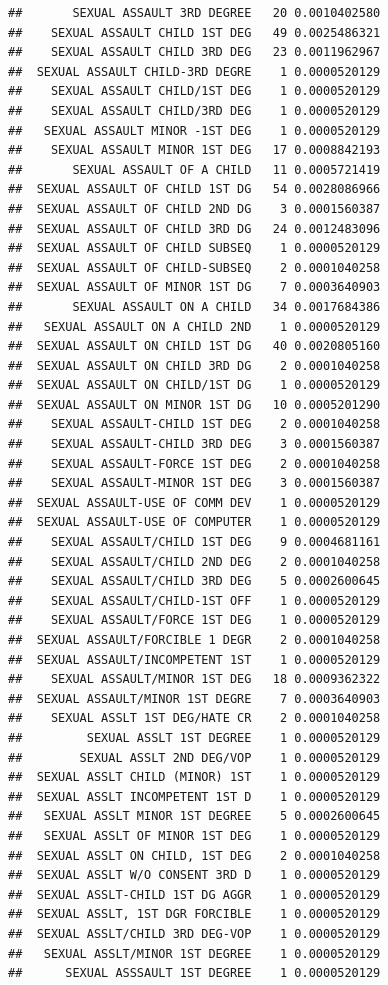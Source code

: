\documentclass[]{book}
\begin{document}
\begin{verbatim}
##       SEXUAL ASSAULT 3RD DEGREE   20 0.0010402580
##    SEXUAL ASSAULT CHILD 1ST DEG   49 0.0025486321
##    SEXUAL ASSAULT CHILD 3RD DEG   23 0.0011962967
##  SEXUAL ASSAULT CHILD-3RD DEGRE    1 0.0000520129
##    SEXUAL ASSAULT CHILD/1ST DEG    1 0.0000520129
##    SEXUAL ASSAULT CHILD/3RD DEG    1 0.0000520129
##   SEXUAL ASSAULT MINOR -1ST DEG    1 0.0000520129
##    SEXUAL ASSAULT MINOR 1ST DEG   17 0.0008842193
##       SEXUAL ASSAULT OF A CHILD   11 0.0005721419
##  SEXUAL ASSAULT OF CHILD 1ST DG   54 0.0028086966
##  SEXUAL ASSAULT OF CHILD 2ND DG    3 0.0001560387
##  SEXUAL ASSAULT OF CHILD 3RD DG   24 0.0012483096
##  SEXUAL ASSAULT OF CHILD SUBSEQ    1 0.0000520129
##  SEXUAL ASSAULT OF CHILD-SUBSEQ    2 0.0001040258
##  SEXUAL ASSAULT OF MINOR 1ST DG    7 0.0003640903
##       SEXUAL ASSAULT ON A CHILD   34 0.0017684386
##   SEXUAL ASSAULT ON A CHILD 2ND    1 0.0000520129
##  SEXUAL ASSAULT ON CHILD 1ST DG   40 0.0020805160
##  SEXUAL ASSAULT ON CHILD 3RD DG    2 0.0001040258
##  SEXUAL ASSAULT ON CHILD/1ST DG    1 0.0000520129
##  SEXUAL ASSAULT ON MINOR 1ST DG   10 0.0005201290
##    SEXUAL ASSAULT-CHILD 1ST DEG    2 0.0001040258
##    SEXUAL ASSAULT-CHILD 3RD DEG    3 0.0001560387
##    SEXUAL ASSAULT-FORCE 1ST DEG    2 0.0001040258
##    SEXUAL ASSAULT-MINOR 1ST DEG    3 0.0001560387
##  SEXUAL ASSAULT-USE OF COMM DEV    1 0.0000520129
##  SEXUAL ASSAULT-USE OF COMPUTER    1 0.0000520129
##    SEXUAL ASSAULT/CHILD 1ST DEG    9 0.0004681161
##    SEXUAL ASSAULT/CHILD 2ND DEG    2 0.0001040258
##    SEXUAL ASSAULT/CHILD 3RD DEG    5 0.0002600645
##    SEXUAL ASSAULT/CHILD-1ST OFF    1 0.0000520129
##    SEXUAL ASSAULT/FORCE 1ST DEG    1 0.0000520129
##  SEXUAL ASSAULT/FORCIBLE 1 DEGR    2 0.0001040258
##  SEXUAL ASSAULT/INCOMPETENT 1ST    1 0.0000520129
##    SEXUAL ASSAULT/MINOR 1ST DEG   18 0.0009362322
##  SEXUAL ASSAULT/MINOR 1ST DEGRE    7 0.0003640903
##    SEXUAL ASSLT 1ST DEG/HATE CR    2 0.0001040258
##         SEXUAL ASSLT 1ST DEGREE    1 0.0000520129
##        SEXUAL ASSLT 2ND DEG/VOP    1 0.0000520129
##  SEXUAL ASSLT CHILD (MINOR) 1ST    1 0.0000520129
##  SEXUAL ASSLT INCOMPETENT 1ST D    1 0.0000520129
##   SEXUAL ASSLT MINOR 1ST DEGREE    5 0.0002600645
##   SEXUAL ASSLT OF MINOR 1ST DEG    1 0.0000520129
##  SEXUAL ASSLT ON CHILD, 1ST DEG    2 0.0001040258
##  SEXUAL ASSLT W/O CONSENT 3RD D    1 0.0000520129
##  SEXUAL ASSLT-CHILD 1ST DG AGGR    1 0.0000520129
##  SEXUAL ASSLT, 1ST DGR FORCIBLE    1 0.0000520129
##  SEXUAL ASSLT/CHILD 3RD DEG-VOP    1 0.0000520129
##   SEXUAL ASSLT/MINOR 1ST DEGREE    1 0.0000520129
##      SEXUAL ASSSAULT 1ST DEGREE    1 0.0000520129

\end{verbatim}
\end{document}
